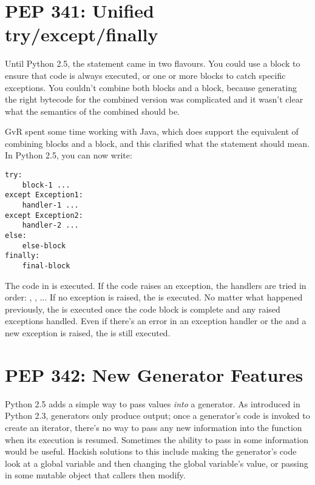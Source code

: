 \documentclass{howto}
\begin{document}
\section{PEP 341: Unified try/except/finally\label{pep-341}}

Until Python 2.5, the  statement came in two
flavours. You could use a  block to ensure that code
is always executed, or one or more  blocks to catch 
specific exceptions.  You couldn't combine both  blocks and a
 block, because generating the right bytecode for the
combined version was complicated and it wasn't clear what the
semantics of the combined should be.  

GvR spent some time working with Java, which does support the
equivalent of combining  blocks and a
 block, and this clarified what the statement should
mean.  In Python 2.5, you can now write:

\begin{verbatim}
try:
    block-1 ...
except Exception1:
    handler-1 ...
except Exception2:
    handler-2 ...
else:
    else-block
finally:
    final-block 
\end{verbatim}

The code in  is executed.  If the code raises an
exception, the handlers are tried in order: ,
, ...  If no exception is raised, the 
is executed.  No matter what happened previously, the
 is executed once the code block is complete and any
raised exceptions handled.  Even if there's an error in an exception
handler or the  and a new exception is raised, the
 is still executed.

\begin{seealso}


\end{seealso}


\section{PEP 342: New Generator Features\label{pep-342}}

Python 2.5 adds a simple way to pass values \emph{into} a generator.
As introduced in Python 2.3, generators only produce output; once a
generator's code is invoked to create an iterator, there's no way to
pass any new information into the function when its execution is
resumed.  Sometimes the ability to pass in some information would be
useful.  Hackish solutions to this include making the generator's code
look at a global variable and then changing the global variable's
value, or passing in some mutable object that callers then modify.
\end{document}
